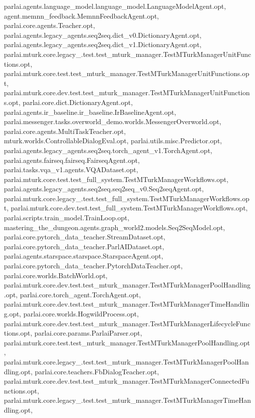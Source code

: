 parlai.\+agents.\+language\+\_\+model.\+language\+\_\+model.\+Language\+Model\+Agent.\+opt, agent.\+memnn\+\_\+feedback.\+Memnn\+Feedback\+Agent.\+opt, parlai.\+core.\+agents.\+Teacher.\+opt, parlai.\+agents.\+legacy\+\_\+agents.\+seq2seq.\+dict\+\_\+v0.\+Dictionary\+Agent.\+opt, parlai.\+agents.\+legacy\+\_\+agents.\+seq2seq.\+dict\+\_\+v1.\+Dictionary\+Agent.\+opt, parlai.\+mturk.\+core.\+legacy\+\_.\+test.\+test\+\_\+mturk\+\_\+manager.\+Test\+M\+Turk\+Manager\+Unit\+Functions.\+opt, parlai.\+mturk.\+core.\+test.\+test\+\_\+mturk\+\_\+manager.\+Test\+M\+Turk\+Manager\+Unit\+Functions.\+opt, parlai.\+mturk.\+core.\+dev.\+test.\+test\+\_\+mturk\+\_\+manager.\+Test\+M\+Turk\+Manager\+Unit\+Functions.\+opt, parlai.\+core.\+dict.\+Dictionary\+Agent.\+opt, parlai.\+agents.\+ir\+\_\+baseline.\+ir\+\_\+baseline.\+Ir\+Baseline\+Agent.\+opt, parlai.\+messenger.\+tasks.\+overworld\+\_\+demo.\+worlds.\+Messenger\+Overworld.\+opt, parlai.\+core.\+agents.\+Multi\+Task\+Teacher.\+opt, mturk.\+worlds.\+Controllable\+Dialog\+Eval.\+opt, parlai.\+utils.\+misc.\+Predictor.\+opt, parlai.\+agents.\+legacy\+\_\+agents.\+seq2seq.\+torch\+\_\+agent\+\_\+v1.\+Torch\+Agent.\+opt, parlai.\+agents.\+fairseq.\+fairseq.\+Fairseq\+Agent.\+opt, parlai.\+tasks.\+vqa\+\_\+v1.\+agents.\+V\+Q\+A\+Dataset.\+opt, parlai.\+mturk.\+core.\+test.\+test\+\_\+full\+\_\+system.\+Test\+M\+Turk\+Manager\+Workflows.\+opt, parlai.\+agents.\+legacy\+\_\+agents.\+seq2seq.\+seq2seq\+\_\+v0.\+Seq2seq\+Agent.\+opt, parlai.\+mturk.\+core.\+legacy\+\_.\+test.\+test\+\_\+full\+\_\+system.\+Test\+M\+Turk\+Manager\+Workflows.\+opt, parlai.\+mturk.\+core.\+dev.\+test.\+test\+\_\+full\+\_\+system.\+Test\+M\+Turk\+Manager\+Workflows.\+opt, parlai.\+scripts.\+train\+\_\+model.\+Train\+Loop.\+opt, mastering\+\_\+the\+\_\+dungeon.\+agents.\+graph\+\_\+world2.\+models.\+Seq2\+Seq\+Model.\+opt, parlai.\+core.\+pytorch\+\_\+data\+\_\+teacher.\+Stream\+Dataset.\+opt, parlai.\+core.\+pytorch\+\_\+data\+\_\+teacher.\+Parl\+A\+I\+Dataset.\+opt, parlai.\+agents.\+starspace.\+starspace.\+Starspace\+Agent.\+opt, parlai.\+core.\+pytorch\+\_\+data\+\_\+teacher.\+Pytorch\+Data\+Teacher.\+opt, parlai.\+core.\+worlds.\+Batch\+World.\+opt, parlai.\+mturk.\+core.\+dev.\+test.\+test\+\_\+mturk\+\_\+manager.\+Test\+M\+Turk\+Manager\+Pool\+Handling.\+opt, parlai.\+core.\+torch\+\_\+agent.\+Torch\+Agent.\+opt, parlai.\+mturk.\+core.\+dev.\+test.\+test\+\_\+mturk\+\_\+manager.\+Test\+M\+Turk\+Manager\+Time\+Handling.\+opt, parlai.\+core.\+worlds.\+Hogwild\+Process.\+opt, parlai.\+mturk.\+core.\+dev.\+test.\+test\+\_\+mturk\+\_\+manager.\+Test\+M\+Turk\+Manager\+Lifecycle\+Functions.\+opt, parlai.\+core.\+params.\+Parlai\+Parser.\+opt, parlai.\+mturk.\+core.\+test.\+test\+\_\+mturk\+\_\+manager.\+Test\+M\+Turk\+Manager\+Pool\+Handling.\+opt, parlai.\+mturk.\+core.\+legacy\+\_.\+test.\+test\+\_\+mturk\+\_\+manager.\+Test\+M\+Turk\+Manager\+Pool\+Handling.\+opt, parlai.\+core.\+teachers.\+Fb\+Dialog\+Teacher.\+opt, parlai.\+mturk.\+core.\+dev.\+test.\+test\+\_\+mturk\+\_\+manager.\+Test\+M\+Turk\+Manager\+Connected\+Functions.\+opt, parlai.\+mturk.\+core.\+legacy\+\_.\+test.\+test\+\_\+mturk\+\_\+manager.\+Test\+M\+Turk\+Manager\+Time\+Handling.\+opt, 